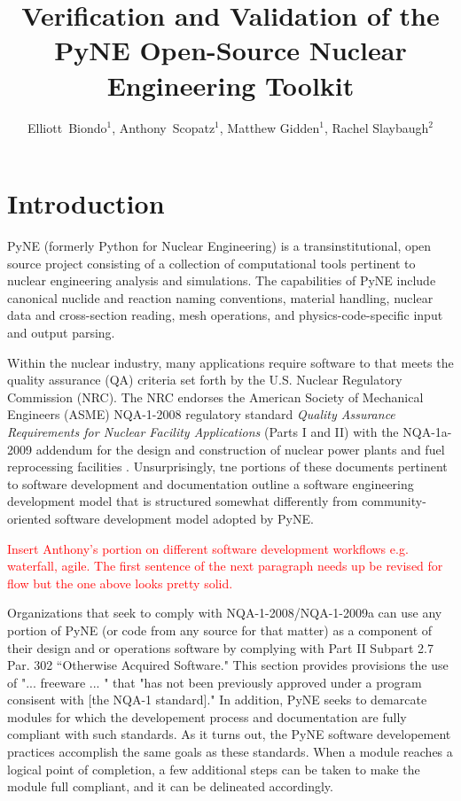 \documentclass{anstrans}
\title{Verification and Validation of the PyNE Open-Source Nuclear Engineering Toolkit}
\author{Elliott~Biondo$^{1}$, Anthony~Scopatz$^{1}$, Matthew Gidden$^{1}$, Rachel Slaybaugh$^{2}$}
\institute{
\and $^{1}$ The University of Wisconsin-Madison, 1500 Engineering Drive, Madison, WI 53706\\
\and $^{2}$ The University of California, Berkeley, 2521 Hearst Ave, Berkeley, CA 94709 \\
}
\begin{document}
\section{Introduction}

PyNE \cite{scopatz_pyne} (formerly Python for Nuclear Engineering) is a
transinstitutional, open source project consisting of a collection of
computational tools pertinent to nuclear engineering analysis and simulations.
The capabilities of PyNE include canonical nuclide and reaction naming
conventions, material handling, nuclear data and cross-section reading, mesh
operations, and physics-code-specific input and output parsing. %

Within the nuclear industry, many applications require software to that meets
the quality assurance (QA) criteria set forth by the U.S. Nuclear Regulatory
Commission (NRC). The NRC endorses the American Society of Mechanical Engineers
(ASME) NQA-1-2008 regulatory standard \emph{Quality Assurance Requirements for
Nuclear Facility Applications} (Parts I and II) \cite{nrc} with the NQA-1a-2009
addendum \cite{add} for the design and construction of nuclear power plants and
fuel reprocessing facilities \cite{nrc}. Unsurprisingly, tne portions of these
documents pertinent to software development and documentation outline a
software engineering development model that is structured somewhat differently
from community-oriented software development model adopted by PyNE. 

\textcolor{red}{Insert Anthony's portion on different software development
workflows e.g. waterfall, agile. The first sentence of the next paragraph needs
up be revised for flow but the one above looks pretty solid.}

Organizations that seek to comply with NQA-1-2008/NQA-1-2009a can use any
portion of PyNE (or code from any source for that matter) as a component of
their design and or operations software by complying with Part II Subpart 2.7
Par. 302 ``Otherwise Acquired Software." This section provides provisions the
use of "... freeware ... " that "has not been previously approved under a
program consisent with [the NQA-1 standard]." In addition, PyNE seeks to
demarcate modules for which the developement process and documentation are
fully compliant with such standards. As it turns out, the PyNE software
developement practices accomplish the same goals as these standards.  When a
module reaches a logical point of completion, a few additional steps can be
taken to make the module full compliant, and it can be delineated accordingly.
\end{document}
